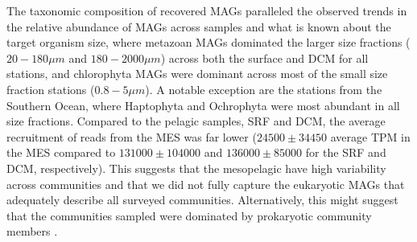 \documentclass[12pt]{article}
\numberwithin{equation}{section}
\begin{document}
\begin{figure}[t]
\end{figure}
The taxonomic composition of recovered MAGs paralleled the observed trends in the relative abundance of MAGs across samples and what is known about the target organism size, where metazoan MAGs dominated the larger size fractions ($20-180 \mu m$ and $180-2000 \mu m$) across both the surface and DCM for all stations, and chlorophyta MAGs were dominant across most of the small size fraction stations ($0.8-5 \mu m$). A notable exception are the stations from the Southern Ocean, where Haptophyta and Ochrophyta were most abundant in all size fractions. Compared to the pelagic samples, SRF and DCM, the average recruitment of reads from the MES was far lower ($24500 \pm 34450$ average TPM in the MES compared to $131000 \pm 104000 $ and $136000 \pm 85000$ for the SRF and DCM, respectively). This suggests that the mesopelagic have high variability across communities \citep{Pernice_2015} and that we did not fully capture the eukaryotic MAGs that adequately describe all surveyed communities. Alternatively, this might suggest that the communities sampled were dominated by prokaryotic community members \citep{Pernice_2014}.  
\end{document}
